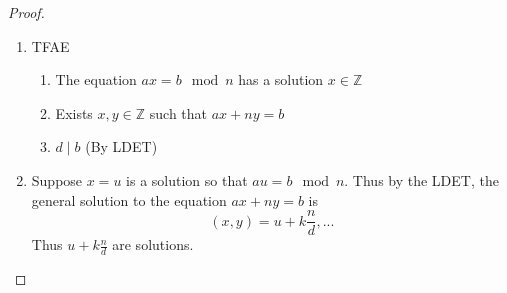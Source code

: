 \begin{proof} 
\begin{enumerate}
\item TFAE
\begin{enumerate}
\item The equation $ax = b \mod n$ has a solution $x\in \mathbb{Z}$ 
\item Exists $x,y \in \mathbb{Z}$ such that $ax+ny =b$
\item $d\mid b$ (By LDET)
\end{enumerate}
\item Suppose $x=u$ is a solution so that $au = b \mod n$. Thus by the LDET, the general solution to the equation $ax+ny = b$ is \[(x,y) = u + k\frac{n}{d}, ...\] Thus $\displaystyle u + k\frac{n}{d}$ are solutions.
\end{enumerate}
\end{proof}








